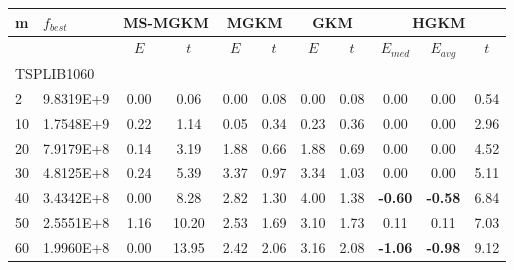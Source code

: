 {\footnotesize
\centering
\begin{longtable}{@{}llccccccccc@{}}
\hline
\multicolumn{1}{l|}{m}   & \multicolumn{1}{l|}{$f_{best}$} & \multicolumn{2}{c|}{MS-MGKM}        & \multicolumn{2}{c|}{MGKM}           & \multicolumn{2}{c|}{GKM}            & \multicolumn{3}{c}{HGKM}                  \\ \hline
                         & \multicolumn{1}{l|}{}           & $E$  & \multicolumn{1}{c|}{$t$}     & $E$  & \multicolumn{1}{c|}{$t$}     & $E$  & \multicolumn{1}{c|}{$t$}     & $E_{med}$      & $E_{avg}$      & $t$     \\ \hline
\multicolumn{11}{l}{TSPLIB1060}                                                                                                                                                                                          \\ \hline
\multicolumn{1}{l|}{2}   & \multicolumn{1}{l|}{9.8319E+9}  & 0.00 & \multicolumn{1}{c|}{0.06}    & 0.00 & \multicolumn{1}{c|}{0.08}    & 0.00 & \multicolumn{1}{c|}{0.08}    & 0.00           & 0.00           & 0.54    \\
\multicolumn{1}{l|}{10}  & \multicolumn{1}{l|}{1.7548E+9}  & 0.22 & \multicolumn{1}{c|}{1.14}    & 0.05 & \multicolumn{1}{c|}{0.34}    & 0.23 & \multicolumn{1}{c|}{0.36}    & 0.00           & 0.00           & 2.96    \\
\multicolumn{1}{l|}{20}  & \multicolumn{1}{l|}{7.9179E+8}  & 0.14 & \multicolumn{1}{c|}{3.19}    & 1.88 & \multicolumn{1}{c|}{0.66}    & 1.88 & \multicolumn{1}{c|}{0.69}    & 0.00           & 0.00           & 4.52    \\
\multicolumn{1}{l|}{30}  & \multicolumn{1}{l|}{4.8125E+8}  & 0.24 & \multicolumn{1}{c|}{5.39}    & 3.37 & \multicolumn{1}{c|}{0.97}    & 3.34 & \multicolumn{1}{c|}{1.03}    & 0.00           & 0.00           & 5.11    \\
\multicolumn{1}{l|}{40}  & \multicolumn{1}{l|}{3.4342E+8}  & 0.00 & \multicolumn{1}{c|}{8.28}    & 2.82 & \multicolumn{1}{c|}{1.30}    & 4.00 & \multicolumn{1}{c|}{1.38}    & \textbf{-0.60} & \textbf{-0.58} & 6.84    \\
\multicolumn{1}{l|}{50}  & \multicolumn{1}{l|}{2.5551E+8}  & 1.16 & \multicolumn{1}{c|}{10.20}   & 2.53 & \multicolumn{1}{c|}{1.69}    & 3.10 & \multicolumn{1}{c|}{1.73}    & 0.11           & 0.11           & 7.03    \\
\multicolumn{1}{l|}{60}  & \multicolumn{1}{l|}{1.9960E+8}  & 0.00 & \multicolumn{1}{c|}{13.95}   & 2.42 & \multicolumn{1}{c|}{2.06}    & 3.16 & \multicolumn{1}{c|}{2.08}    & \textbf{-1.06} & \textbf{-0.98} & 9.12    \\

\end{longtable}}
